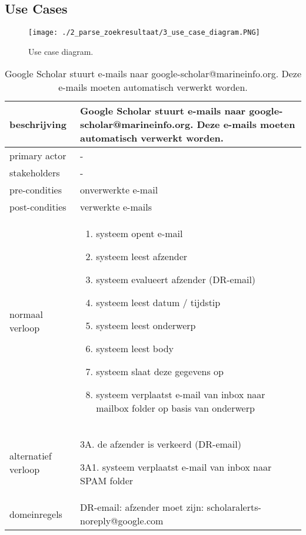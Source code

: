 \subsection{Use Cases}
\begin{figure}
    \centering
    \texttt{[image: ./2\_parse\_zoekresultaat/3\_use\_case\_diagram.PNG]}
    \caption[Use case diagram.]{\label{fig:Use case diagram}Use case diagram.}
\end{figure}
\FloatBarrier
\newpage
\begin{table}[ptb]
    \centering
    \begin{tabular}{ | m{5cm} | m{10cm}| } 
        \hline
        \rowcolor{lightgray}
        beschrijving & Google Scholar stuurt e-mails naar google-scholar@marineinfo.org. Deze e-mails moeten automatisch verwerkt worden. \\ 
        \hline
        primary actor & - \\ 
        \hline
        stakeholders & - \\ 
        \hline
        pre-condities & onverwerkte e-mail \\ 
        \hline
        post-condities & verwerkte e-mails \\ 
        \hline
        normaal verloop & 
        \begin{enumerate}
            \item systeem opent e-mail
            \item systeem leest afzender
            \item systeem evalueert afzender (DR-email)
            \item systeem leest datum / tijdstip
            \item systeem leest onderwerp
            \item systeem leest body
            \item systeem slaat deze gegevens op
            \item systeem verplaatst e-mail van inbox naar mailbox folder op basis van onderwerp
        \end{enumerate} \\ 
        \hline
        alternatief verloop & 
        \begin{description}
            \item 3A. de afzender is verkeerd (DR-email)
            \item 3A1. systeem verplaatst e-mail van inbox naar SPAM folder
        \end{description} \\ 
        \hline
        domeinregels & DR-email: afzender moet zijn: scholaralerts-noreply@google.com \\ 
        \hline
    \end{tabular}
    \caption{Google Scholar stuurt e-mails naar google-scholar@marineinfo.org. Deze e-mails moeten automatisch verwerkt worden.}
\end{table}
